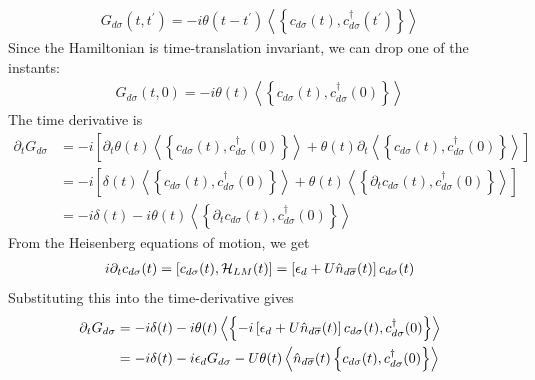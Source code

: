 \documentclass[12pt,twoside]{report}
\numberwithin{equation}{section}
\begin{document}
\begin{equation}\begin{aligned}
	G_{d\sigma}(t, t^\prime) = -i\theta(t-t^\prime) \left<\left\{ c_{d\sigma}(t), c^\dagger_{d\sigma}(t^\prime) \right\} \right>
\end{aligned}\end{equation}
Since the Hamiltonian is time-translation invariant, we can drop one of the instants:
\begin{equation}\begin{aligned}
	G_{d\sigma}(t, 0) = -i\theta(t) \left<\left\{ c_{d\sigma}(t), c^\dagger_{d\sigma}(0) \right\} \right>
\end{aligned}\end{equation}
The time derivative is
\begin{equation}\begin{aligned}
	\partial_t G_{d\sigma} &= -i \left[\partial_t \theta(t) \left<\left\{ c_{d\sigma}(t), c^\dagger_{d\sigma}(0) \right\} \right> + \theta(t) \partial_t \left<\left\{ c_{d\sigma}(t), c^\dagger_{d\sigma}(0) \right\} \right>\right] \\
			       &= -i \left[\delta(t) \left<\left\{ c_{d\sigma}(t), c^\dagger_{d\sigma}(0) \right\} \right> + \theta(t) \left<\left\{ \partial_t c_{d\sigma}(t), c^\dagger_{d\sigma}(0) \right\} \right>\right]\\
			       &= -i \delta(t) -i\theta(t) \left<\left\{ \partial_t c_{d\sigma}(t), c^\dagger_{d\sigma}(0) \right\} \right>
\end{aligned}\end{equation}
From the Heisenberg equations of motion, we get
\begin{equation}\begin{aligned}
	i \partial_t c_{d\sigma}(t) = \left[c_{d\sigma}(t), \mathcal{H}_{LM}(t)\right] = \left[\epsilon_d + U \hat n_{d\overline\sigma}(t)\right]c_{d\sigma}(t)
\end{aligned}\end{equation}
Substituting this into the time-derivative gives
\begin{equation}\begin{aligned}
	\partial_t G_{d\sigma} &= -i \delta(t) -i \theta(t) \left<\left\{ -i\left[\epsilon_d + U \hat n_{d\overline\sigma}(t)\right]c_{d\sigma}(t), c^\dagger_{d\sigma}(0) \right\} \right>\\
			       &= -i \delta(t) - i\epsilon_d G_{d\sigma} - U \theta(t) \left<\hat n_{d\overline\sigma}(t)\left\{c_{d\sigma}(t), c^\dagger_{d\sigma}(0) \right\} \right>\\
\end{aligned}\end{equation}
\end{document}
